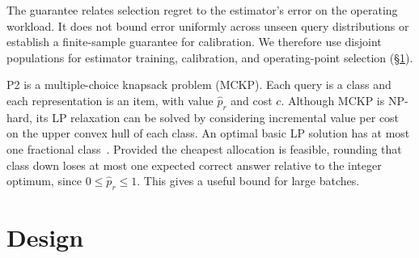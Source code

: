 The guarantee relates selection regret to the estimator's error on the
operating workload. It does not bound error uniformly across unseen query
distributions or establish a finite-sample guarantee for calibration. We
therefore use disjoint populations for estimator training, calibration, and
operating-point selection (\S\ref{sec:design}).

P2 is a multiple-choice knapsack problem (MCKP). Each query is a class and
each representation is an item, with value $\widehat p_r$ and cost $c$.
Although MCKP is NP-hard, its LP relaxation can be solved by considering
incremental value per cost on the upper convex hull of each class. An optimal
basic LP solution has at most one fractional class~\cite{sinha1979mckp}.
Provided the cheapest allocation is feasible, rounding that class down loses
at most one expected correct answer relative to the integer optimum, since
$0\le\widehat p_r\le1$. This gives a useful bound for large batches.

\section{\system Design}
\label{sec:design}

